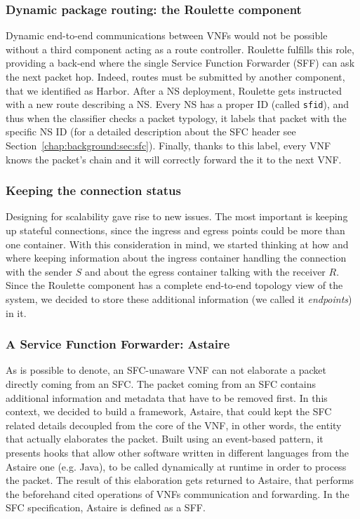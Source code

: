 \subsubsection{Dynamic package routing: the Roulette component}
\label{chap:prjan:sec:tech:sub:SFC:sub:roulette}
Dynamic end-to-end communications between VNFs would not be possible without a
third component acting as a route controller. Roulette fulfills this role,
providing a back-end where the single Service Function Forwarder (SFF) can ask
the next packet hop. Indeed, routes must be submitted by another component, that
we identified as Harbor. After a NS deployment, Roulette gets instructed with a
new route describing a NS. Every NS has a proper ID (called \verb!sfid!), and
thus when the classifier checks a packet typology, it labels that packet with
the specific NS ID (for a detailed description about the SFC header see
Section~\ref{chap:background:sec:sfc}). Finally, thanks to this label, every VNF
knows the packet's chain and it will correctly forward the it to the next VNF.

\subsubsection{Keeping the connection status}
Designing for scalability gave rise to new issues. The most important is keeping
up stateful connections, since the ingress and egress points could be more than
one container. With this consideration in mind, we started thinking at how and
where keeping information about the ingress container handling the connection
with the sender $S$ and about the egress container talking with the receiver
$R$. Since the Roulette component has a complete end-to-end topology view of the
system, we decided to store these additional information (we called it
\emph{endpoints}) in it.

\subsubsection{A Service Function Forwarder: Astaire}
As is possible to denote, an SFC-unaware VNF can not elaborate a packet directly
coming from an SFC. The packet coming from an SFC contains additional
information and metadata that have to be removed first. In this context, we
decided to build a framework, Astaire, that could kept the SFC related details
decoupled from the core of the VNF, in other words, the entity that actually
elaborates the packet. Built using an event-based pattern, it presents hooks
that allow other software written in different languages from the Astaire one
(e.g. Java), to be called dynamically at runtime in order to process the packet.
The result of this elaboration gets returned to Astaire, that performs the
beforehand cited operations of VNFs communication and forwarding. In the SFC
specification, Astaire is defined as a SFF.

